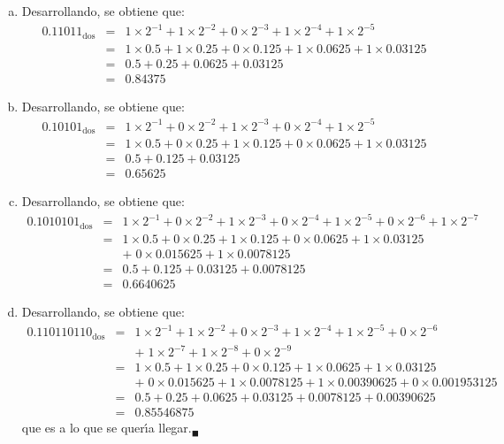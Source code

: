 \begin{solucion}
 $\phantom{0}$
 \begin{enumerate}[(a)]
  \item Desarrollando, se obtiene que:
  \begin{eqnarray*}
   0.11011_{\text{dos}} & = & 1 \times 2^{-1} + 1 \times 2^{-2} + 0 \times 2^{-3} + 1 \times 2^{-4} + 1 \times 2^{-5} \\
   & = & 1 \times 0.5 + 1 \times 0.25 + 0 \times 0.125 + 1 \times 0.0625 + 1 \times 0.03125 \\
   & = & 0.5 + 0.25 + 0.0625 + 0.03125 \\
   & = & 0.84375 
  \end{eqnarray*}

  \item Desarrollando, se obtiene que:
  \begin{eqnarray*}
   0.10101_{\text{dos}} & = & 1 \times 2^{-1} + 0 \times 2^{-2} + 1 \times 2^{-3} + 0 \times 2^{-4} + 1 \times 2^{-5} \\
   & = & 1 \times 0.5 + 0 \times 0.25 + 1 \times 0.125 + 0 \times 0.0625 + 1 \times 0.03125 \\
   & = & 0.5 + 0.125 + 0.03125 \\
   & = & 0.65625
  \end{eqnarray*}

  \item Desarrollando, se obtiene que:
  \begin{eqnarray*}
   0.1010101_{\text{dos}} & = & 1 \times 2^{-1} + 0 \times 2^{-2} + 1 \times 2^{-3} + 0 \times 2^{-4} + 1 \times 2^{-5} + 0 \times 2^{-6} + 1 \times 2^{-7} \\
   & = & 1 \times 0.5 + 0 \times 0.25 + 1 \times 0.125 + 0 \times 0.0625 + 1 \times 0.03125 \\
   & & + \; 0 \times 0.015625 + 1 \times 0.0078125 \\
   & = & 0.5 + 0.125 + 0.03125 + 0.0078125 \\
   & = & 0.6640625
  \end{eqnarray*}

  \item Desarrollando, se obtiene que:
  \begin{eqnarray*}
   0.110110110_{\text{dos}} & = & 1 \times 2^{-1} + 1 \times 2^{-2} + 0 \times 2^{-3} + 1 \times 2^{-4} + 1 \times 2^{-5} + 0 \times 2^{-6} \\ 
   & & + \; 1 \times 2^{-7} + 1 \times 2^{-8} + 0 \times 2^{-9} \\
   & = & 1 \times 0.5 + 1 \times 0.25 + 0 \times 0.125 + 1 \times 0.0625 + 1 \times 0.03125 \\ 
   & & + \; 0 \times 0.015625 + 1 \times 0.0078125 + 1 \times 0.00390625 + 0 \times 0.001953125 \\
   & = & 0.5 + 0.25 + 0.0625 + 0.03125 + 0.0078125 + 0.00390625 \\
   & = & 0.85546875
  \end{eqnarray*}
  que es a lo que se quer\'{\i}a llegar.${}_{\blacksquare}$
 \end{enumerate}
\end{solucion}
